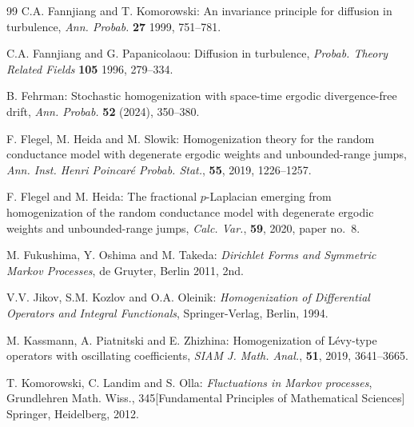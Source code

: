 \documentclass[11pt,draft, reqno]{amsart}
\newcommand{\R}{\mathds R}
\theoremstyle{definition}
\numberwithin{equation}{section}
\begin{document}
\begin{thebibliography}{99}
 C.A. Fannjiang and T. Komorowski: An invariance principle for diffusion in turbulence,
\emph{Ann. Probab.} {\bf 27} 1999, 751--781.

 C.A. Fannjiang and G. Papanicolaou: Diffusion in turbulence,
\emph{Probab. Theory Related Fields} \textbf{105} 1996, 279--334.

  B. Fehrman: Stochastic homogenization with space-time ergodic divergence-free drift,
\emph{Ann. Probab.} \textbf{52} (2024), 350--380.

 F. Flegel, M. Heida and M. Slowik: Homogenization theory for the random conductance model with degenerate ergodic weights and unbounded-range jumps,
\emph{Ann. Inst. Henri Poincar\'e Probab. Stat.}, {\bf 55}, 2019, 1226--1257.

 F. Flegel and M. Heida: The fractional $p$-Laplacian emerging from homogenization of the
random conductance model with degenerate ergodic weights
and unbounded-range jumps,
\emph{Calc. Var.}, {\bf 59}, 2020,
paper no.\ 8.

M. Fukushima, Y. Oshima and M. Takeda: \emph{Dirichlet Forms and Symmetric Markov Processes}, de Gruyter, Berlin 2011, 2nd.



V.V. Jikov, S.M. Kozlov and O.A. Oleinik: \emph{Homogenization of Differential Operators and Integral Functionals},
Springer-Verlag, Berlin, 1994.


  M. Kassmann, A. Piatnitski and E. Zhizhina: Homogenization of L\'evy-type operators with oscillating coefficients,  \emph{SIAM J. Math. Anal.}, {\bf 51}, 2019, 3641--3665.




  T. Komorowski, C. Landim and S. Olla: \emph{Fluctuations in Markov processes},
Grundlehren Math. Wiss., 345[Fundamental Principles of Mathematical Sciences]
Springer, Heidelberg, 2012.


\end{thebibliography}
\end{document}
